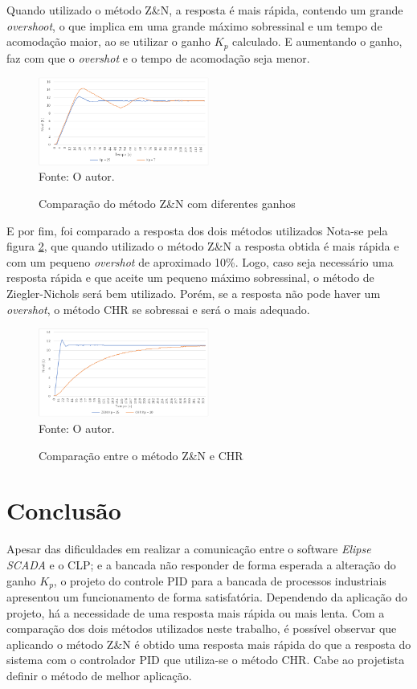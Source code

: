 \documentclass[conference]{IEEEtran}
\begin{document}
Quando utilizado o método Z\&N, a resposta é mais rápida, contendo um grande \textit{overshoot}, o que implica em uma grande máximo sobressinal e um tempo de acomodação maior, ao se utilizar o ganho \(K_p\) calculado. E aumentando o ganho, faz com que o \textit{overshot} e o tempo de acomodação seja menor.

\begin{figure}[!http]
    \centering
    \caption{Comparação do método Z\&N com diferentes ganhos}
    \includegraphics[width=0.5\textwidth]{imagens/grafico_Z&N.png}\\
    Fonte: O autor.
    \label{ZN}
\end{figure}

E por fim, foi comparado a resposta dos dois métodos utilizados Nota-se pela figura \ref{ZNCHR}, que quando utilizado o método Z\&N a resposta obtida é mais rápida e com um pequeno \textit{overshot} de aproximado 10\%. Logo, caso seja necessário uma resposta rápida e que aceite um pequeno máximo sobressinal, o método de Ziegler-Nichols será bem utilizado. Porém, se a resposta não pode haver um \textit{overshot}, o método CHR se sobressai e será o mais adequado.

\begin{figure}[!http]
    \centering
    \caption{Comparação entre o método Z\&N e CHR}
    \includegraphics[width=0.5\textwidth]{imagens/grafico_Z&N_CHR.png}\\
    Fonte: O autor.
    \label{ZNCHR}
\end{figure}

\section{Conclusão}
Apesar das dificuldades em realizar a comunicação entre o software \textit{Elipse SCADA} e o CLP; e a bancada não responder de forma esperada a alteração do ganho $K_p$, o projeto do controle PID para a bancada de processos industriais apresentou um funcionamento de forma satisfatória. Dependendo da aplicação do projeto, há a necessidade de uma resposta mais rápida ou mais lenta. Com a comparação dos dois métodos utilizados neste trabalho, é possível observar que aplicando o método Z\&N é obtido uma resposta mais rápida do que a resposta do sistema com o controlador PID que utiliza-se o método CHR. Cabe ao projetista definir o método de melhor aplicação.
\end{document}
